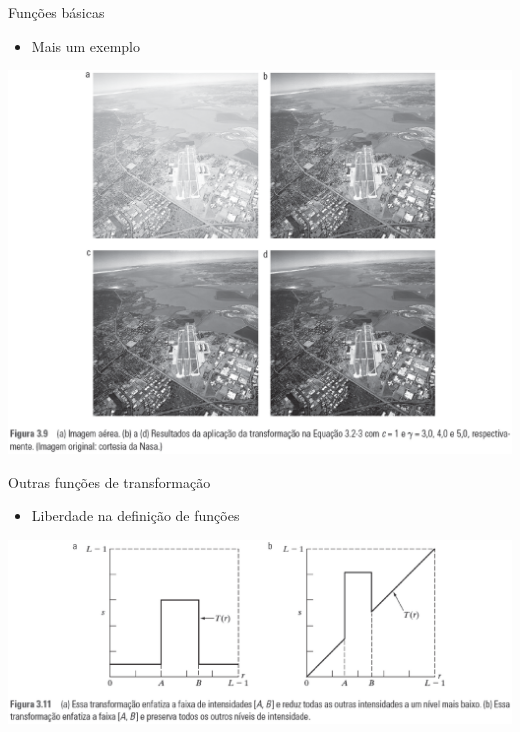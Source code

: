        \begin{slide}[toc=]{Funções básicas}
      \begin{itemize}
       \item Mais um exemplo
      \end{itemize}
         \begin{center}
                  \includegraphics[height=0.65\textheight]{figs/fig0309}
               \end{center}
         
       \end{slide}
       
   \begin{slide}[toc=]{Outras funções de transformação}
      \begin{itemize}
         \item Liberdade na definição de funções
      \end{itemize}
         \begin{center}
             \includegraphics[width=\textwidth]{figs/fig0311}
         \end{center}
    \end{slide}

